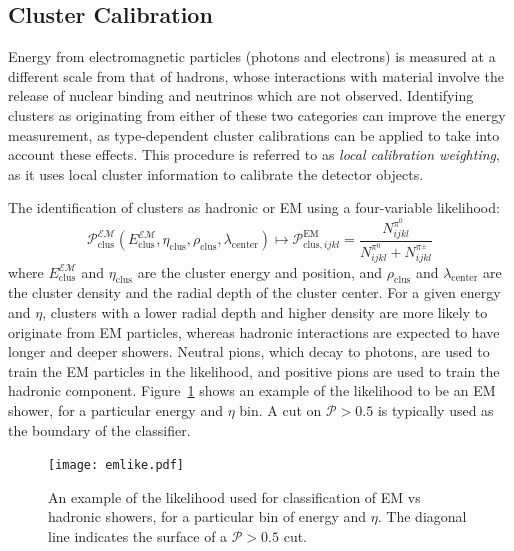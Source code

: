 \subsection{Cluster Calibration}

Energy from electromagnetic particles (photons and electrons) is measured at a different scale from that of hadrons, whose interactions with material involve the release of nuclear binding and neutrinos which are not observed. Identifying clusters as originating from either of these two categories can improve the energy measurement, as type-dependent cluster calibrations can be applied to take into account these effects. This procedure is referred to as \textit{local calibration weighting}, as it uses local cluster information to calibrate the detector objects.

The identification of clusters as hadronic or EM using a four-variable likelihood:
%
\begin{equation}
\mathcal{P}_\mathrm{clus}^\mathcal{EM}(E_\mathrm{clus}^\mathcal{EM}, \eta_\mathrm{clus}, \rho_\mathrm{clus},\lambda_\mathrm{center} ) \mapsto \mathcal{P}^\mathrm{EM}_{\mathrm{clus},ijkl} = \frac{N_{ijkl}^{\pi^0}}{N_{ijkl}^{\pi^0} + N_{ijkl}^{\pi^\pm}}
\end{equation}
%
where $E_\mathrm{clus}^\mathcal{EM}$ and $\eta_\mathrm{clus}$ are the cluster energy and position, and $\rho_\mathrm{clus}$ and $\lambda_\mathrm{center}$ are the cluster density and the radial depth of the cluster center. For a given energy and $\eta$, clusters with a lower radial depth and higher density are more likely to originate from EM particles, whereas hadronic interactions are expected to have longer and deeper showers. Neutral pions, which decay to photons, are used to train the EM particles in the likelihood, and positive pions are used to train the hadronic component. Figure~\ref{fig:jet-reconstruction:cluster-calibration:em-like} shows an example of the likelihood to be an EM shower, for a particular energy and $\eta$ bin. A cut on $\mathcal{P} > 0.5$ is typically used as the boundary of the classifier.


\begin{figure}
\centering
\texttt{[image: emlike.pdf]}
\label{fig:jet-reconstruction:cluster-calibration:em-like}
\caption{An example of the likelihood used for classification of EM vs hadronic showers, for a particular bin of energy and $\eta$. The diagonal line indicates the surface of a $\mathcal{P} > 0.5$ cut.}
\end{figure}


